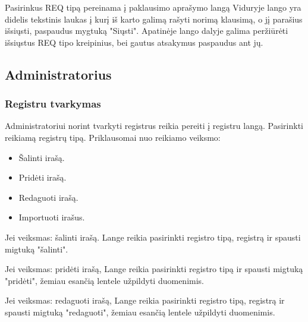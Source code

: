 	
	Pasirinkus REQ tipą pereinama į paklausimo aprašymo langą 
	Viduryje lango yra didelis tekstinis laukas į kurį iš karto galimą rašyti norimą klausimą, o jį parašius išsiųsti, paspaudus mygtuką "Siųsti".
	Apatinėje lango dalyje galima peržiūrėti išsiųstus REQ tipo kreipinius, bei gautus atsakymus paspaudus ant jų.
	

\subsection{Administratorius}

	\subsubsection{Registru tvarkymas}
	
	Administratoriui norint tvarkyti registrus reikia pereiti į registru langą. Pasirinkti reikiamą registrų tipą. 
	Priklausomai nuo reikiamo veiksmo:
	
	\begin{itemize}
		\item Šalinti irašą.
		\item Pridėti irašą.
		\item Redaguoti irašą.
		\item Importuoti irašus.
	\end{itemize}
	
	
	Jei veiksmas: šalinti irašą. Lange  reikia pasirinkti registro tipą, registrą ir spausti migtuką "šalinti".

	Jei veiksmas: pridėti irašą, Lange  reikia pasirinkti registro tipą ir spausti migtuką "pridėti", žemiau esančią lentele užpildyti duomenimis.

	Jei veiksmas: redaguoti irašą, Lange  reikia pasirinkti registro tipą, registrą ir spausti migtuką "redaguoti", žemiau esančią lentele užpildyti duomenimis.
	
	
